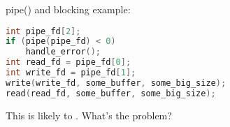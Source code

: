 
\begin{frame}[fragile,label=pipeAndBlocking]{pipe() and blocking}
 example:
\begin{lstlisting}[language=C++,style=small]
int pipe_fd[2];
if (pipe(pipe_fd) < 0)
    handle_error();
int read_fd = pipe_fd[0];
int write_fd = pipe_fd[1];
write(write_fd, some_buffer, some_big_size);
read(read_fd, some_buffer, some_big_size);
\end{lstlisting}
This is likely to . What's the problem?
\end{frame}
